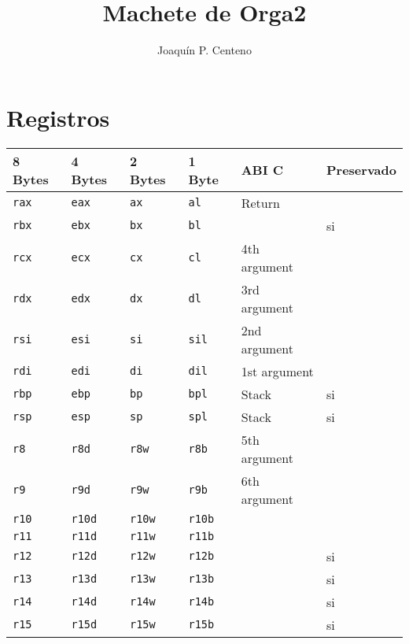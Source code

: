 \documentclass{article}
\begin{document}
\title{Machete de Orga2}
\author{Joaqu\'in P. Centeno}
\maketitle

\section{Registros}

\begin{tabular}{ l l l l l l }
    \toprule
    \textbf{8 Bytes} & \textbf{4 Bytes} & \textbf{2 Bytes} & \textbf{1 Byte} & \textbf{ABI C} & Preservado \\
    \midrule
    \texttt{rax} & \texttt{eax}  & \texttt{ax}   & \texttt{al}   & Return       &    \\
    \texttt{rbx} & \texttt{ebx}  & \texttt{bx}   & \texttt{bl}   &              & si \\
    \texttt{rcx} & \texttt{ecx}  & \texttt{cx}   & \texttt{cl}   & 4th argument &    \\
    \texttt{rdx} & \texttt{edx}  & \texttt{dx}   & \texttt{dl}   & 3rd argument &    \\
    \texttt{rsi} & \texttt{esi}  & \texttt{si}   & \texttt{sil}  & 2nd argument &    \\
    \texttt{rdi} & \texttt{edi}  & \texttt{di}   & \texttt{dil}  & 1st argument &    \\
    \texttt{rbp} & \texttt{ebp}  & \texttt{bp}   & \texttt{bpl}  & Stack        & si \\
    \texttt{rsp} & \texttt{esp}  & \texttt{sp}   & \texttt{spl}  & Stack        & si \\
    \texttt{r8}  & \texttt{r8d}  & \texttt{r8w}  & \texttt{r8b}  & 5th argument &    \\
    \texttt{r9}  & \texttt{r9d}  & \texttt{r9w}  & \texttt{r9b}  & 6th argument &    \\
    \texttt{r10} & \texttt{r10d} & \texttt{r10w} & \texttt{r10b} &              &    \\
    \texttt{r11} & \texttt{r11d} & \texttt{r11w} & \texttt{r11b} &              &    \\
    \texttt{r12} & \texttt{r12d} & \texttt{r12w} & \texttt{r12b} &              & si \\
    \texttt{r13} & \texttt{r13d} & \texttt{r13w} & \texttt{r13b} &              & si \\
    \texttt{r14} & \texttt{r14d} & \texttt{r14w} & \texttt{r14b} &              & si \\
    \texttt{r15} & \texttt{r15d} & \texttt{r15w} & \texttt{r15b} &              & si \\
    \bottomrule
\end{tabular}
\end{document}
